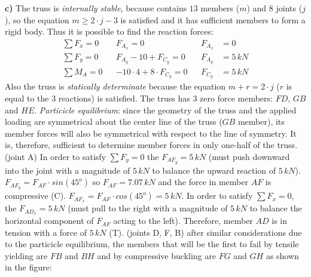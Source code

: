 \documentclass[10pt,a4paper]{article}
\begin{document}
\textbf{\huge{c)}} The truss is \emph{internally stable}, because contains $13$ members ($m$) and $8$ joints ($j$), so the equation $m \geq 2 \cdot j - 3$ is satisfied and it has sufficient members to form a rigid body. Thus it is possible to find the reaction forces:
\begin{align*}
\sum{F_x}=0 & & F_{A_x} = 0 & & F_{A_x} &= 0 \\
\sum{F_y}=0 & & F_{A_y} -10 + F_{C_y}=0 & & F_{A_y} &= 5 \, kN \\
\sum{M_A}=0 & & -10 \cdot 4 + 8 \cdot F_{C_y}= 0 & & F_{C_y} &= 5 \, kN
\end{align*}
Also the truss is \emph{statically determinate} because the equation $m + r = 2 \cdot j$ ($r$ is equal to the $3$ reactions) is satisfied. The truss has $3$ zero force members: $FD$, $GB$ and $HE$.
\newline
\newline
\emph{Particicle equilibrium}: since the geometry of the truss and the applied loading are symmetrical about the center line of the truss ($GB$ member), its member forces will also be symmetrical with respect to the line of symmetry. It is, therefore, sufficient to determine member forces in only one-half of the truss.
\newline
\newline
(joint A) In order to satisfy $\sum F_y = 0$ the $F_{AF_y}= 5\,kN$ (must push downward into the joint with a magnitude of $5\,kN$ to balance the upward reaction of $5\,kN$). $F_{AF_y}= F_{AF} \cdot sin(45^{o})$ so $F_{AF} = 7.07 \, kN$ and the force in member $AF$ is compressive (C). $F_{AF_x}= F_{AF} \cdot cos(45^{o})= 5 \, kN$.
\newline
In order to satisfy $\sum F_x = 0$, the $F_{AD_x}= 5\,kN$ (must pull to the right with a magnitude of $5\,kN$ to balance the horizontal component of $F_{AF}$ acting to the left). Therefore, member $AD$ is in tension with a force of $5\,kN$ (T). 
\newline
\newline
(joints D, F, B) after similar considerations due to the particicle equilibrium, the members that will be the first to fail by tensile yielding are $FB$ and $BH$ and by compressive buckling are $FG$ and $GH$ as shown in the figure:
\end{document}
